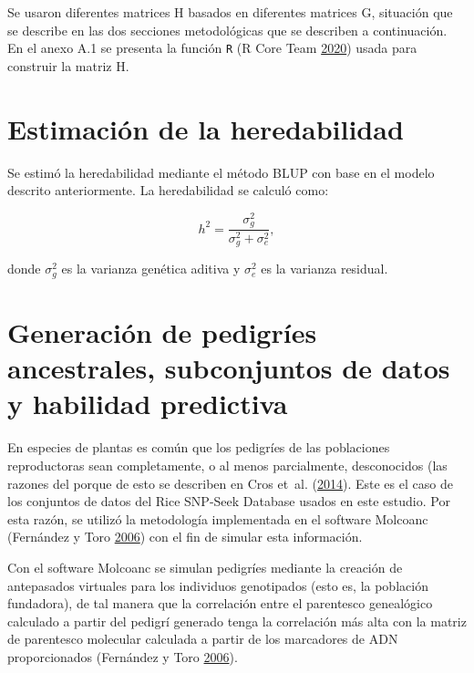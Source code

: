 \documentclass[11pt,spanish,a4paper,oneside,]{book} %
\begin{document}
Se usaron diferentes matrices H basados en diferentes matrices G, situación que se describe en las dos secciones metodológicas que se describen a continuación. En el anexo A.1 se presenta la función \texttt{R} (R Core Team \protect\hyperlink{ref-cite:52}{2020}) usada para construir la matriz H.

\hypertarget{estimaciuxf3n-de-la-heredabilidad}{%
\section{Estimación de la heredabilidad}\label{estimaciuxf3n-de-la-heredabilidad}}

Se estimó la heredabilidad mediante el método BLUP con base en el modelo descrito anteriormente. La heredabilidad se calculó como:

\begin{equation}
h^{2} = \frac{\sigma^{2}_{g}}{\sigma^{2}_{g} + \sigma^{2}_{e}},
\end{equation}

donde \(\sigma^{2}_{g}\) es la varianza genética aditiva y \(\sigma^{2}_{e}\) es la varianza residual.

\hypertarget{generaciuxf3n-de-pedigruxedes-ancestrales-subconjuntos-de-datos-y-habilidad-predictiva}{%
\section{Generación de pedigríes ancestrales, subconjuntos de datos y habilidad predictiva}\label{generaciuxf3n-de-pedigruxedes-ancestrales-subconjuntos-de-datos-y-habilidad-predictiva}}

En especies de plantas es común que los pedigríes de las poblaciones reproductoras sean completamente, o al menos parcialmente, desconocidos (las razones del porque de esto se describen en Cros et~al. (\protect\hyperlink{ref-cite:48}{2014}). Este es el caso de los conjuntos de datos del Rice SNP-Seek Database usados en este estudio. Por esta razón, se utilizó la metodología implementada en el software Molcoanc (Fernández y Toro \protect\hyperlink{ref-cite:24}{2006}) con el fin de simular esta información.

Con el software Molcoanc se simulan pedigríes mediante la creación de antepasados virtuales para los individuos genotipados (esto es, la población fundadora), de tal manera que la correlación entre el parentesco genealógico calculado a partir del pedigrí generado tenga la correlación más alta con la matriz de parentesco molecular calculada a partir de los marcadores de ADN proporcionados (Fernández y Toro \protect\hyperlink{ref-cite:24}{2006}).
\end{document}
